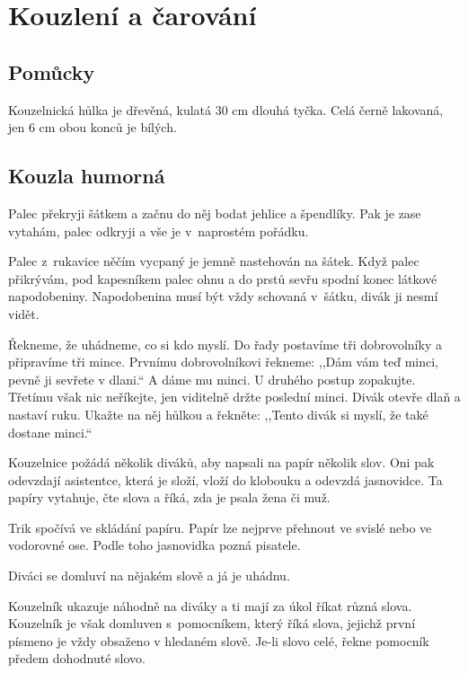 \section{Kouzlení a čarování}

\subsection{Pomůcky}

Kouzelnická hůlka je dřevěná, kulatá 30 cm dlouhá tyčka. Celá 
černě lakovaná, jen 6 cm obou konců je bílých.

\subsection{Kouzla humorná}

Palec překryji šátkem a začnu do něj bodat jehlice a 
špendlíky. Pak je zase vytahám, palec odkryji a vše je v~naprostém 
pořádku.

Palec z~rukavice něčím vycpaný je jemně nastehován 
na šátek. Když palec přikrývám, pod kapesníkem palec ohnu a do 
prstů sevřu spodní konec látkové napodobeniny. Napodobenina musí 
být vždy schovaná v~šátku, divák ji nesmí vidět.


Řekneme, že uhádneme, co si kdo myslí. Do řady postavíme 
tři dobrovolníky a připravíme tři mince. Prvnímu dobrovolníkovi 
řekneme: ,,Dám vám teď minci, pevně ji sevřete v dlani.`` A dáme 
mu minci. U druhého postup zopakujte. Třetímu však nic neříkejte, 
jen viditelně držte poslední minci. Divák otevře dlaň a nastaví 
ruku. Ukažte na něj hůlkou a řekněte: ,,Tento divák si myslí, 
že také dostane minci.``


Kouzelnice požádá několik diváků, aby napsali na papír 
několik slov. Oni pak odevzdají asistentce, která je složí, vloží 
do klobouku a odevzdá jasnovidce. Ta papíry vytahuje, čte slova 
a říká, zda je psala žena či muž.

Trik spočívá ve skládání papíru. Papír lze nejprve přehnout 
ve svislé nebo ve vodorovné ose. Podle toho jasnovidka pozná 
pisatele.


Diváci se domluví na nějakém slově a já je uhádnu.

Kouzelník ukazuje náhodně na diváky a ti mají za úkol říkat 
různá slova. Kouzelník je však domluven s~pomocníkem, 
který říká slova, jejichž první písmeno je vždy obsaženo v hledaném 
slově. Je-li slovo celé, řekne pomocník předem dohodnuté slovo.


